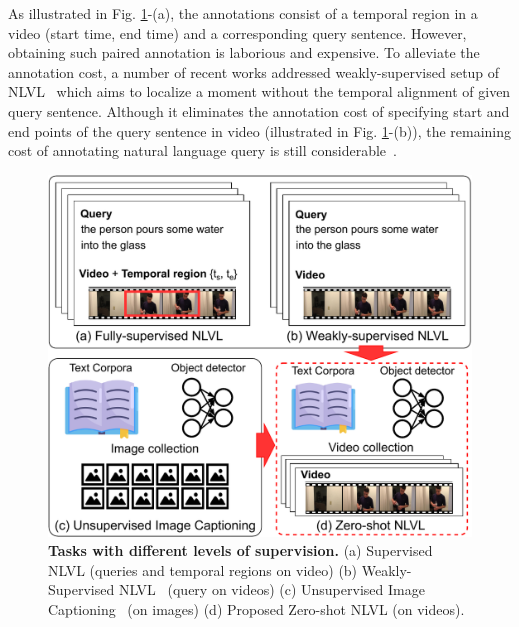 As illustrated in Fig. \ref{fig:task}-(a), the annotations consist of a temporal region in a video (start time, end time) and a corresponding query sentence.
However, obtaining such paired annotation is laborious and expensive.
To alleviate the annotation cost, a number of recent works addressed weakly-supervised setup of NLVL~\cite{wslln,scn,wsdec} which aims to localize a moment without the temporal alignment of given query sentence.
Although it eliminates the annotation cost of specifying start and end points of the query sentence in video (illustrated in Fig. \ref{fig:task}-(b)), the remaining cost of annotating natural language query is still considerable~\cite{Feng2019UnsupervisedIC}.

\begin{figure}[t]
    \centering
    \includegraphics[width=0.99\columnwidth]{figures/task.pdf}
    \caption{\textbf{Tasks with different levels of supervision.} (a) Supervised NLVL (queries and temporal regions on video) (b) Weakly-Supervised NLVL~\cite{wslln,scn} (query on videos) (c) Unsupervised Image Captioning~\cite{Feng2019UnsupervisedIC,laina2019towards} (on images) (d) Proposed Zero-shot NLVL (on videos).}
    \vspace{-1em}
    \label{fig:task}
\end{figure}

